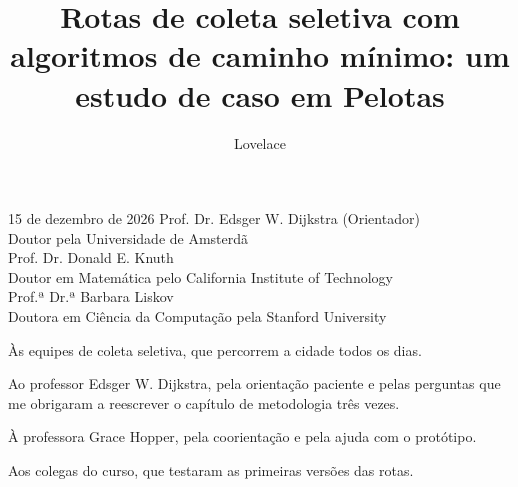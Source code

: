 \documentclass[tcc,capa]{texufpel}
\title{Rotas de coleta seletiva com algoritmos de caminho mínimo: um estudo de caso em Pelotas}
\author{Lovelace}{Ada}                          %
\begin{document}
\renewcommand{\coadvisorname}{Coorientadora}

\maketitle   %

\fichacatalografica

\begin{aprovacao}{15 de dezembro de 2026}
\noindent Prof. Dr. Edsger W. Dijkstra (Orientador)\\
Doutor pela Universidade de Amsterdã\\[1cm]

\noindent Prof. Dr. Donald E. Knuth\\
Doutor em Matemática pelo California Institute of Technology\\[1cm]

\noindent Prof.ª Dr.ª Barbara Liskov\\
Doutora em Ciência da Computação pela Stanford University
\end{aprovacao}

\begin{dedicatoria}
Às equipes de coleta seletiva, que percorrem a cidade todos os dias.
\end{dedicatoria}

\begin{agradecimentos}
Ao professor Edsger W. Dijkstra, pela orientação paciente e pelas perguntas
que me obrigaram a reescrever o capítulo de metodologia três vezes.

À professora Grace Hopper, pela coorientação e pela ajuda com o protótipo.

Aos colegas do curso, que testaram as primeiras versões das rotas.
\end{agradecimentos}
\end{document}
